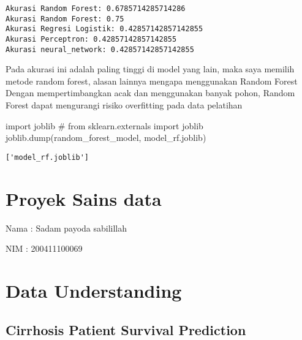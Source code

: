 \documentclass[
  letterpaper,
]{krantz}
\makeatletter
\newenvironment{Shaded}{\begin{snugshade}}{\end{snugshade}}
\newcommand{\CommentTok}[1]{\textcolor[rgb]{0.37,0.37,0.37}{#1}}
\newcommand{\ImportTok}[1]{\textcolor[rgb]{0.00,0.46,0.62}{#1}}
\newcommand{\NormalTok}[1]{\textcolor[rgb]{0.00,0.23,0.31}{#1}}
\newcommand{\StringTok}[1]{\textcolor[rgb]{0.13,0.47,0.30}{#1}}
\newenvironment{kframe}{%
\medskip{}
\setlength{\fboxsep}{.8em}
 \def\at@end@of@kframe{}%
 \ifinner\ifhmode%
  \def\at@end@of@kframe{\end{minipage}}%
  \begin{minipage}{\columnwidth}%
 \fi\fi%
 \def\FrameCommand##1{\hskip\@totalleftmargin \hskip-\fboxsep
 \colorbox{shadecolor}{##1}\hskip-\fboxsep
     \hskip-\linewidth \hskip-\@totalleftmargin \hskip\columnwidth}%
 \MakeFramed {\advance\hsize-\width
   \@totalleftmargin\z@ \linewidth\hsize
   \@setminipage}}%
 {\par\unskip\endMakeFramed%
 \at@end@of@kframe}
\renewenvironment{Shaded}{\begin{kframe}}{\end{kframe}}
\makeatother
\begin{document}
\begin{verbatim}
Akurasi Random Forest: 0.6785714285714286
Akurasi Random Forest: 0.75
Akurasi Regresi Logistik: 0.42857142857142855
Akurasi Perceptron: 0.42857142857142855
Akurasi neural_network: 0.42857142857142855
\end{verbatim}

Pada akurasi ini adalah paling tinggi di model yang lain, maka saya
memilih metode random forest, alasan lainnya mengapa menggunakan Random
Forest Dengan mempertimbangkan acak dan menggunakan banyak pohon, Random
Forest dapat mengurangi risiko overfitting pada data pelatihan

\begin{Shaded}
\begin{Highlighting}[]
\ImportTok{import}\NormalTok{ joblib}
\CommentTok{\# from sklearn.externals import joblib}
\NormalTok{joblib.dump(random\_forest\_model, }\StringTok{\textquotesingle{}model\_rf.joblib\textquotesingle{}}\NormalTok{)}
\end{Highlighting}
\end{Shaded}

\begin{verbatim}
['model_rf.joblib']
\end{verbatim}

\mainmatter


\hypertarget{proyek-sains-data-1}{%
\chapter*{Proyek Sains data}\label{proyek-sains-data-1}}


Nama : Sadam payoda sabilillah

NIM : 200411100069


\hypertarget{data-understanding-1}{%
\chapter{Data Understanding}\label{data-understanding-1}}

\hypertarget{cirrhosis-patient-survival-prediction-1}{%
\section*{Cirrhosis Patient Survival
Prediction}\label{cirrhosis-patient-survival-prediction-1}}
\end{document}
